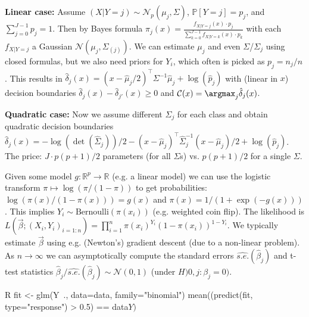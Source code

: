 \begin{sectionbox}\nospacing{}
  \textbf{Linear case: }Assume $(X | Y=j) \sim \mathcal{N}_p(\mu_j, \Sigma)$, $\mathbb{P}[Y=j] = p_j$, and $\sum_{j=0}^{J-1}p_j=1$.
  Then by Bayes formula $\pi_j(x) = \frac{f_{X|Y=j}(x)\cdot p_j}{\sum_{k=0}^{J-1}f_{X|Y=k}(x)\cdot p_k}$ with each $f_{X|Y=j}$ a Gaussian $\mathcal{N}(\mu_j, \Sigma_{(j)})$.
  We can estimate $\mu_j$ and even $\Sigma$/$\Sigma_j$ using closed formulas, but we also need priors for $Y_i$, which often is picked as $p_j=n_j/n$.
  This results in $\hat \delta_j(x) = (x-\hat{\mu}_j/2)^{\top}\Sigma^{-1}\hat{\mu}_j+\log(\hat p_j)$ with (linear in $x$) decision boundaries $\hat{\delta}_j(x) - \hat \delta_{j'}(x) \geq 0$ and $\mathcal{C}(x) = \argmax_j \hat \delta_j(x)$.

  \textbf{Quadratic case: } Now we assume different $\Sigma_j$ for each class and obtain quadratic decision boundaries $\hat{\delta}_j(x) = -\log(\det(\hat\Sigma_j))/2 - (x-\hat{\mu}_j)^{\top}\hat{\Sigma}_j^{-1}(x-\hat{\mu}_j)/2 + \log(\hat p_j)$.
  The price: $J\cdot p(p+1)/2$ parameters (for all $\Sigma$s) vs. $p(p+1)/2$ for a single $\Sigma$.
\end{sectionbox}

\begin{sectionbox}\nospacing{}
  Given some model $g: \mathbb{R}^p \to \mathbb{R}$ (e.g. a linear model) we can use the logistic transform $\pi \mapsto \log(\pi/(1-\pi))$ to get probabilities: $\log(\pi(x)/(1-\pi(x))) = g(x)$ and $\pi(x) = 1/(1+\exp{(-g(x))})$.
  This implies $Y_i \sim \text{Bernoulli}(\pi(x_i))$ (e.g. weighted coin flip). The likelihood is $L(\vec{\beta}; (X_i,Y_i)_{i=1:n}) = \prod_{i=1}^n\pi(x_i)^{Y_i}(1-\pi(x_i))^{1-Y_i}$.
  We typically estimate $\vec{\beta}$ using e.g. (Newton's) gradient descent (due to a non-linear problem).
  As $n\to \infty$ we can asymptotically compute the standard errors $\widehat{s.e.}(\hat{\beta}_j)$ and t-test statistics $\hat\beta_j/\widehat{s.e.}(\hat\beta_j) \sim \mathcal{N}(0,1)$ (under $H){0,j}: \beta_j=0)$.
  \begin{mintlinebox}{R}
    fit <- glm(Y~., data=data, family="binomial")
    mean((predict(fit, type="response") > 0.5) == data$Y)$
  \end{mintlinebox}
\end{sectionbox}

